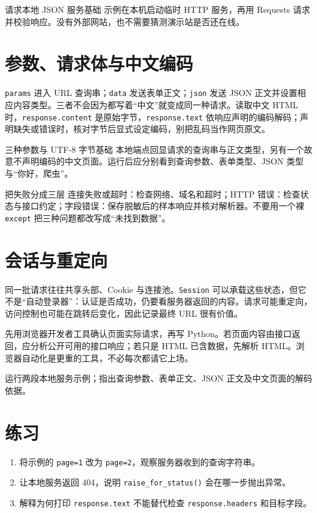 \begin{example}{请求本地 JSON 服务}{基础}
示例在本机启动临时 HTTP 服务，再用 Requests 请求并校验响应。没有外部网站，也不需要猜测演示站是否还在线。
\par\medskip
{}
\end{example}

\section{参数、请求体与中文编码}
\texttt{params} 进入 URL 查询串；\texttt{data} 发送表单正文；\texttt{json} 发送 JSON 正文并设置相应内容类型。三者不会因为都写着“中文”就变成同一种请求。读取中文 HTML 时，\texttt{response.content} 是原始字节，\texttt{response.text} 依响应声明的编码解码；声明缺失或错误时，核对字节后显式设定编码，别把乱码当作网页原文。

\begin{example}{三种参数与 UTF-8 字节}{基础}
本地端点回显请求的查询串与正文类型，另有一个故意不声明编码的中文页面。运行后应分别看到查询参数、表单类型、JSON 类型与“你好，爬虫”。
\end{example}

\begin{method}{把失败分成三层}
连接失败或超时：检查网络、域名和超时；HTTP 错误：检查状态与接口约定；字段错误：保存脱敏后的样本响应并核对解析器。不要用一个裸 \texttt{except} 把三种问题都改写成“未找到数据”。
\end{method}

\section{会话与重定向}
同一批请求往往共享头部、Cookie 与连接池。\texttt{Session} 可以承载这些状态，但它不是“自动登录器”：认证是否成功，仍要看服务器返回的内容。请求可能重定向，访问控制也可能在跳转后变化，因此记录最终 URL 很有价值。

\begin{examtip}
先用浏览器开发者工具确认页面实际请求，再写 Python。若页面内容由接口返回，应分析公开可用的接口响应；若只是 HTML 已含数据，先解析 HTML。浏览器自动化是更重的工具，不必每次都请它上场。
\end{examtip}

\begin{tcolorbox}[title=本章验收,colframe=Teal,colback=Teal!3]
运行两段本地服务示例；指出查询参数、表单正文、JSON 正文及中文页面的解码依据。
\end{tcolorbox}

\section{练习}
\begin{enumerate}[label=\arabic*.]
\item 将示例的 \texttt{page=1} 改为 \texttt{page=2}，观察服务器收到的查询字符串。
\item 让本地服务返回 404，说明 \texttt{raise\_for\_status()} 会在哪一步抛出异常。
\item 解释为何打印 \texttt{response.text} 不能替代检查 \texttt{response.headers} 和目标字段。
\end{enumerate}


